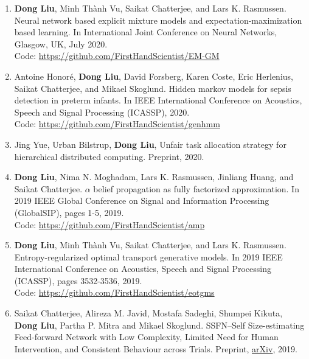 \begin{enumerate}
\item \label{pub-em-flow} \textbf{Dong Liu}, Minh Th\`{a}nh Vu, Saikat Chatterjee, and Lars K. Rasmussen. Neural network based explicit mixture models and expectation-maximization based learning. In International Joint Conference on Neural Networks, Glasgow, UK, July 2020. \\
  Code: \href{https://github.com/FirstHandScientist/EM-GM}{https://github.com/FirstHandScientist/EM-GM}

\item \label{pub-hmm-sepsis} Antoine Honor{\'e}, \textbf{Dong Liu}, David Forsberg, Karen Coste, Eric Herlenius, Saikat Chatterjee, and Mikael Skoglund. Hidden markov models for sepsis detection in preterm infants. In IEEE International Conference on Acoustics, Speech and Signal Processing (ICASSP), 2020.\\
  Code: \href{https://github.com/FirstHandScientist/genhmm}{https://github.com/FirstHandScientist/genhmm}

\item Jing Yue, Urban Bilstrup, \textbf{Dong Liu}, Unfair task allocation strategy for hierarchical distributed computing. Preprint, 2020.
  
\item \label{pub-abp} \textbf{Dong Liu}, Nima N. Moghadam, Lars K. Rasmussen, Jinliang Huang, and Saikat Chatterjee. $\alpha$ belief propagation as fully factorized approximation. In 2019 IEEE Global Conference on Signal and Information Processing (GlobalSIP), pages 1-5, 2019.\\
  Code: \href{https://github.com/FirstHandScientist/amp}{https://github.com/FirstHandScientist/amp}
  
\item \label{pub-eot-gm} \textbf{Dong Liu}, Minh Th\`{a}nh Vu, Saikat Chatterjee, and Lars K. Rasmussen. Entropy-regularized
  optimal transport generative models. In 2019 IEEE International Conference on Acoustics,
  Speech and Signal Processing (ICASSP), pages 3532-3536, 2019.\\
  Code: \href{https://github.com/FirstHandScientist/eotgms}{https://github.com/FirstHandScientist/eotgms}

\item Saikat Chatterjee, Alireza M. Javid, Mostafa Sadeghi, Shumpei Kikuta, \textbf{Dong Liu}, Partha P. Mitra and Mikael Skoglund. SSFN--Self Size-estimating Feed-forward Network with Low Complexity, Limited Need for Human Intervention, and Consistent Behaviour across Trials. Preprint, \href{https://arxiv.org/abs/1905.07111}{arXiv}, 2019.
  

\end{enumerate}
